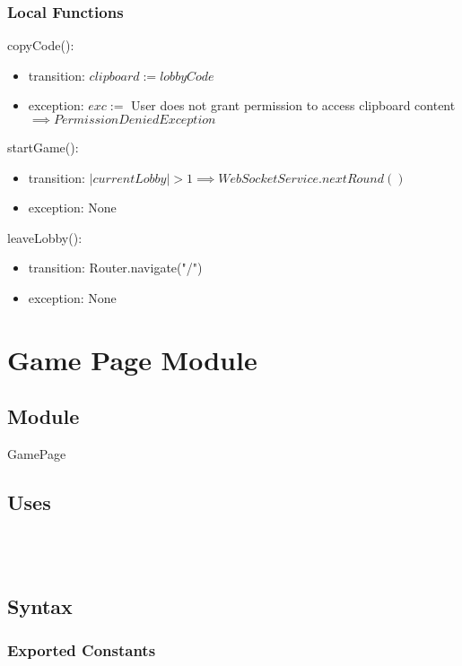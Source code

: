 \documentclass[12pt, titlepage]{article}
\begin{document}
\subsubsection{Local Functions}

\noindent copyCode():
\begin{itemize}
\item transition: $clipboard := lobbyCode$
\item exception: $exc := $ User does not grant permission to access clipboard content \\ $ \implies PermissionDeniedException$
\end{itemize}

\noindent startGame():
\begin{itemize}
\item transition: $|currentLobby| > 1 \implies WebSocketService.nextRound()$
\item exception: None
\end{itemize}

\noindent leaveLobby():
\begin{itemize}
\item transition: Router.navigate("/")
\item exception: None
\end{itemize}

\newpage

\section{Game Page Module} \label{GamePage} 

\subsection{Module}

GamePage

\subsection{Uses}
\\
\\

\subsection{Syntax}

\subsubsection{Exported Constants}
\end{document}
